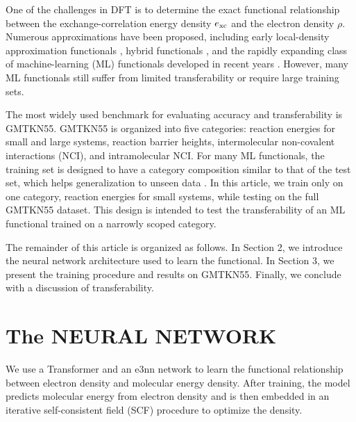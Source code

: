 \documentclass[%
twocolumn,
amsmath,
amssymb,
groupedaddress,
reprint,%
]{revtex4-2}
\begin{document}
One of the challenges in DFT is to determine the exact functional relationship between the exchange-correlation energy density $e_{\rm{xc}}$ and the electron density $\rho$.
% 
Numerous approximations have been proposed, including early local-density approximation functionals \cite{parrDensityFunctionalTheory1980}, hybrid functionals \cite{perdewAtomsMoleculesSolids1992-09-15}, and the rapidly expanding class of machine-learning (ML) functionals developed in recent years \cite{nagaiCompletingDensityFunctional2020-05-05,chenDeePKSComprehensiveDataDriven2021-01-12,kirkpatrickPushingFrontiersDensity2021-12-10,luiseAccurateScalableExchangecorrelation2025-06-23,anMitigatingErrorCancellation2025-08-07}.
% 
However, many ML functionals still suffer from limited transferability or require large training sets.

The most widely used benchmark for evaluating accuracy and transferability is GMTKN55. GMTKN55 is organized into five categories: reaction energies for small and large systems, reaction barrier heights, intermolecular non-covalent interactions (NCI), and intramolecular NCI.
% 
For many ML functionals, the training set is designed to have a category composition similar to that of the test set, which helps generalization to unseen data \cite{kirkpatrickPushingFrontiersDensity2021-12-10,luiseAccurateScalableExchangecorrelation2025-06-23}.
% 
In this article, we train only on one category, reaction energies for small systems, while testing on the full GMTKN55 dataset.
% 
This design is intended to test the transferability of an ML functional trained on a narrowly scoped category.

The remainder of this article is organized as follows. In Section 2, we introduce the neural network architecture used to learn the functional. In Section 3, we present the training procedure and results on GMTKN55. Finally, we conclude with a discussion of transferability.



\section{The NEURAL NETWORK}
We use a Transformer \cite{vaswaniAttentionAllYou2023-08-02} and an e3nn network \cite{TODO} to learn the functional relationship between electron density and molecular energy density.
% 
After training, the model predicts molecular energy from electron density and is then embedded in an iterative self-consistent field (SCF) procedure to optimize the density.
\end{document}
